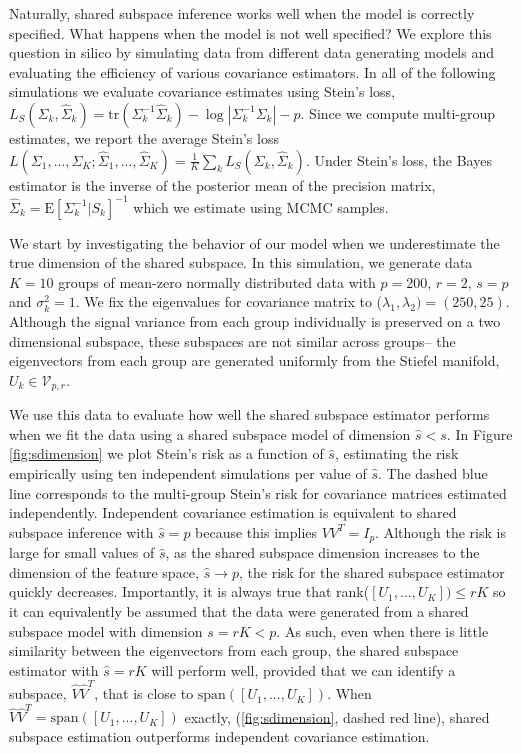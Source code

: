 \documentclass[12pt]{article}
\newcommand{\Exp}[1]{{\text{E}}[ \ensuremath{ #1 } ]  }
\begin{document}
Naturally, shared subspace inference works well when the model is
correctly specified.  What happens when the model is not well
specified?  We explore this question in silico by simulating data from
different data generating models and evaluating the efficiency of
various covariance estimators.  In all of the following simulations we
evaluate covariance estimates using Stein's loss,
$L_S( \Sigma_k , \hat\Sigma_k) = \text{tr}( \Sigma_k^{-1} \hat
\Sigma_k ) - \log |\Sigma_k^{-1} \Sigma_k | - p$.
Since we compute multi-group estimates, we report the
average Stein's loss
$L(\Sigma_1, ..., \Sigma_K; \hat\Sigma_1, ..., \hat\Sigma_K ) =
\frac{1}{K} \sum_k L_S( \Sigma_k , \hat\Sigma_k)$.
Under Stein's loss, the Bayes estimator is the inverse of
the posterior mean of the precision matrix,
$\hat \Sigma_{k} = \Exp{ \Sigma_k^{-1} | S_k}^{-1}$ which we
estimate using MCMC samples.

We start by investigating the behavior of our model when we
underestimate the true dimension of the shared subspace.  In this
simulation, we generate data $K=10$ groups of mean-zero normally
distributed data with $p=200$, $r=2$, $s=p$ and $\sigma_k^2=1$.  We
fix the eigenvalues for covariance matrix to
($\lambda_1, \lambda_2) = (250, 25)$.  Although the signal variance
from each group individually is preserved on a two dimensional
subspace, these subspaces are not similar across groups-- the
eigenvectors from each group are generated uniformly from the Stiefel
manifold, $U_k \in \mathcal{V}_{p, r}$.

We use this data to evaluate how well the shared subspace estimator
performs when we fit the data using a shared subspace model of
dimension $\hat{s} < s$.  In Figure \ref{fig:sdimension} we plot
Stein's risk as a function of $\hat{s}$, estimating the risk
empirically using ten independent simulations per value of $\hat{s}$.
The dashed blue line corresponds to the multi-group Stein's risk for
covariance matrices estimated independently.  Independent covariance
estimation is equivalent to shared subspace inference with
$\hat{s} = p$ because this implies $VV^T = I_p$.  Although the risk is
large for small values of $\hat{s}$, as the shared subspace dimension
increases to the dimension of the feature space,
$\hat{s} \rightarrow p$, the risk for the shared subspace estimator
quickly decreases.  Importantly, it is always true that
rank($[U_1, ..., U_K]) \leq rK$ so it can equivalently be assumed that
the data were generated from a shared subspace model with dimension
$s = rK < p$.  As such, even when there is little similarity between the
eigenvectors from each group, the shared subspace estimator with
$\hat{s} = rK$ will perform well, provided that we can identify a
subspace, $\hat{V}\hat{V}^T$, that is close to
$\text{span}([U_1, ..., U_K])$. When
$\hat{V}\hat{V}^T = \text{span}([U_1, ..., U_K])$ exactly,
(\ref{fig:sdimension}, dashed red line),
shared subspace estimation outperforms independent covariance
estimation.
\end{document}
